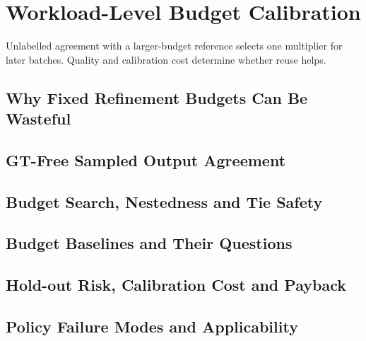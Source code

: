 \chapter{Workload-Level Budget Calibration}
\label{ch:refinement}
Unlabelled agreement with a larger-budget reference selects one multiplier for later batches. Quality and calibration cost determine whether reuse helps.

\section{Why Fixed Refinement Budgets Can Be Wasteful}
\label{sec:6-1}


\section{GT-Free Sampled Output Agreement}
\label{sec:6-2}


\section{Budget Search, Nestedness and Tie Safety}
\label{sec:6-3}


\section{Budget Baselines and Their Questions}
\label{sec:6-4}


\section{Hold-out Risk, Calibration Cost and Payback}
\label{sec:6-5}


\section{Policy Failure Modes and Applicability}
\label{sec:6-6}

